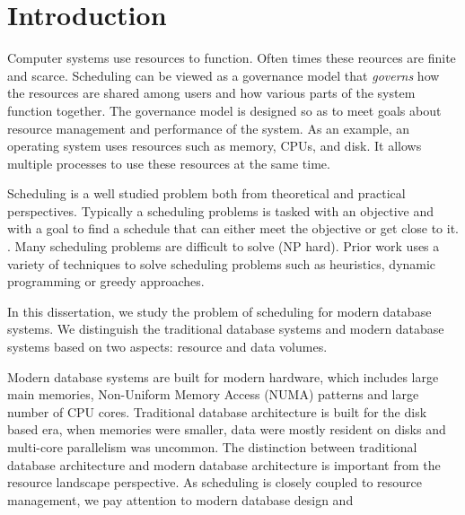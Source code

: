 \chapter{Introduction}
Computer systems use resources to function. 
Often times these reources are finite and scarce. 
Scheduling can be viewed as a governance model that \textit{governs} how the resources are shared among users and how various parts of the system function together. 
The governance model is designed so as to meet goals about resource management and performance of the system. 
As an example, an operating system uses resources such as memory, CPUs, and disk.
It allows multiple processes to use these resources at the same time. 

Scheduling is a well studied problem both from theoretical and practical perspectives. 
Typically a scheduling problems is tasked with an objective and with a goal to find a schedule that can either meet the objective or get close to it.
.
Many scheduling problems are difficult to solve (NP hard).
Prior work uses a variety of techniques to solve scheduling problems such as heuristics, dynamic programming or greedy approaches. 

In this dissertation, we study the problem of scheduling for modern database systems.
We distinguish the traditional database systems and modern database systems based on two aspects: resource and data volumes.

Modern database systems are built for modern hardware, which includes large main memories, Non-Uniform Memory Access (NUMA) patterns and large number of CPU cores.
Traditional database architecture is built for the disk based era, when memories were smaller, data were mostly resident on disks and multi-core parallelism was uncommon. 
The distinction between traditional database architecture and modern database architecture is important from the resource landscape perspective. 
As scheduling is closely coupled to resource management, we pay attention to modern database design and 




